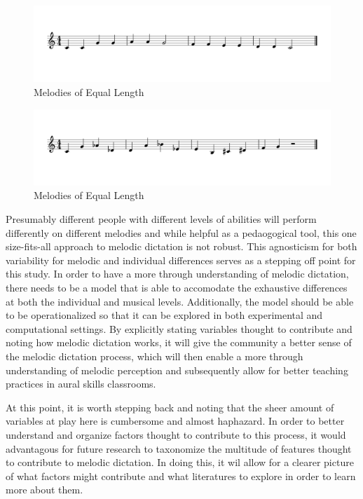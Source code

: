 \documentclass[]{book}
\theoremstyle{definition}
\theoremstyle{definition}
\theoremstyle{definition}
\theoremstyle{remark}
\begin{document}
\begin{figure}

{\centering \includegraphics[width=51.48in]{img/musicalexamples/MMD_Figure2-1} 

}

\caption{Melodies of Equal Length}\label{fig:unnamed-chunk-1}
\end{figure}
\begin{figure}

{\centering \includegraphics[width=51.48in]{img/musicalexamples/MMD_Figure3-1} 

}

\caption{Melodies of Equal Length}\label{fig:unnamed-chunk-1}
\end{figure}

Presumably different people with different levels of abilities will
perform differently on different melodies and while helpful as a
pedaogogical tool, this one size-fits-all approach to melodic dictation
is not robust. This agnosticism for both variability for melodic and
individual differences serves as a stepping off point for this study. In
order to have a more through understanding of melodic dictation, there
needs to be a model that is able to accomodate the exhaustive
differences at both the individual and musical levels. Additionally, the
model should be able to be operationalized so that it can be explored in
both experimental and computational settings. By explicitly stating
variables thought to contribute and noting how melodic dictation works,
it will give the community a better sense of the melodic dictation
process, which will then enable a more through understanding of melodic
perception and subsequently allow for better teaching practices in aural
skills classrooms.

At this point, it is worth stepping back and noting that the sheer
amount of variables at play here is cumbersome and almost haphazard. In
order to better understand and organize factors thought to contribute to
this process, it would advantagous for future research to taxonomize the
multitude of features thought to contribute to melodic dictation. In
doing this, it wil allow for a clearer picture of what factors might
contribute and what literatures to explore in order to learn more about
them.
\end{document}
